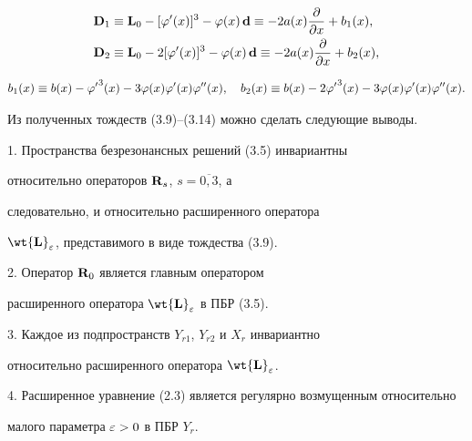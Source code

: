 \begin{align}


\bold{D}_1 & \equiv


\bold{L}_0 - [{\f'} (x)]^3 - \f(x)\, \bold{d} \equiv -2a(x)


\frac{\d}{\d x} + b_1 (x), \\


%


\bold{D}_2 & \equiv


\bold{L}_0 - 2 [{\f'}(x)]^3 - \f(x)\, \bold{d} \equiv -2a(x)


\frac{\d}{\d x} + b_2 (x),


\end{align}


$$


b_1 (x) \equiv b(x) - {\f'}^3 (x) - 3\f(x) \f'(x) \f''(x), \quad


b_2 (x) \equiv b(x) -2 {\f'}^3 (x) - 3\f(x) \f'(x) \f''(x).


$$





Из полученных тождеств (3.9)--(3.14) можно сделать следующие выводы.





1. Пространства безрезонансных решений (3.5) инвариантны


относительно операторов $\bold{R}_s$, $s=\overline{0, 3}$, а


следовательно, и относительно расширенного оператора


$\bold{\wt{L}}_{\e}$, представимого в виде тождества (3.9).





2. Оператор $\bold{R}_0$ является главным оператором


расширенного оператора $\bold{\wt{L}}_{\e}$ в ПБР (3.5).





3. Каждое из подпространств $Y_{r1}$, $Y_{r2}$ и $X_r$ инвариантно


относительно расширенного оператора $\bold{\wt{L}}_{\e}$.





4. Расширенное уравнение (2.3) является регулярно возмущенным относительно


малого параметра $\varepsilon >0$ в ПБР $Y_r$.





